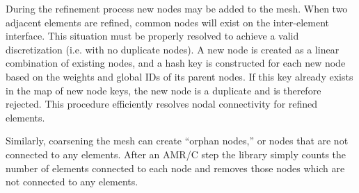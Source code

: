 \documentclass[global,twocolumn,final]{svjour}
\begin{document}
During the refinement process new nodes may be added to the mesh.
When two adjacent elements are refined, common nodes will exist on the
inter-element interface. This situation must be properly resolved to
achieve a valid discretization (i.e. with no duplicate nodes).  A new
node is
created as a linear combination of existing nodes, and a hash key is
constructed for each new node based on the weights and global IDs of
its parent nodes.  If this key already exists in the map of new node
keys, the new node is a duplicate and is therefore rejected.  This
procedure efficiently resolves nodal connectivity for refined
elements.

Similarly, coarsening the mesh can create ``orphan nodes,'' or nodes
that are not connected to any elements.
After an AMR/C step the library simply counts
the number of elements connected to each node and removes those nodes
which are not connected to any elements.
\end{document}
